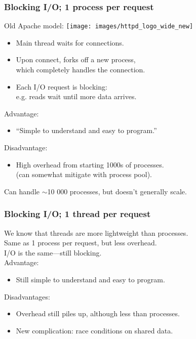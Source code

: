 \begin{frame}
  \frametitle{Blocking I/O; 1 process per request}

  
  Old Apache model: \hfill \texttt{[image: images/httpd\_logo\_wide\_new]}

  \begin{itemize}
    \item Main thread waits for connections.
    \item Upon connect, forks off a new process, \\which completely
      handles the connection.
    \item Each I/O request is blocking: \\ e.g. reads wait until more data arrives.
  \end{itemize}

  Advantage: 
  \begin{itemize}
    \item ``Simple to understand and easy to program.''
  \end{itemize}

  Disadvantage:
  \begin{itemize}
    \item High overhead from starting 1000s of processes.\\
      (can somewhat mitigate with process pool).
  \end{itemize}
  Can handle $\sim$10 000 processes, but doesn't generally scale.

  

\end{frame}

\begin{frame}
  \frametitle{Blocking I/O; 1 thread per request}

  
    We know that threads are more lightweight than processes.\\[1em]

    Same as 1 process per request, but less overhead.\\[1em]

    I/O is the same---still blocking.\\[1em]

    Advantage:
    \begin{itemize}
      \item Still simple to understand and easy to program.
    \end{itemize}

    Disadvantages:
    \begin{itemize}
      \item Overhead still piles up, although less than processes.
      \item New complication: race conditions on shared data.
    \end{itemize}
  
\end{frame}

